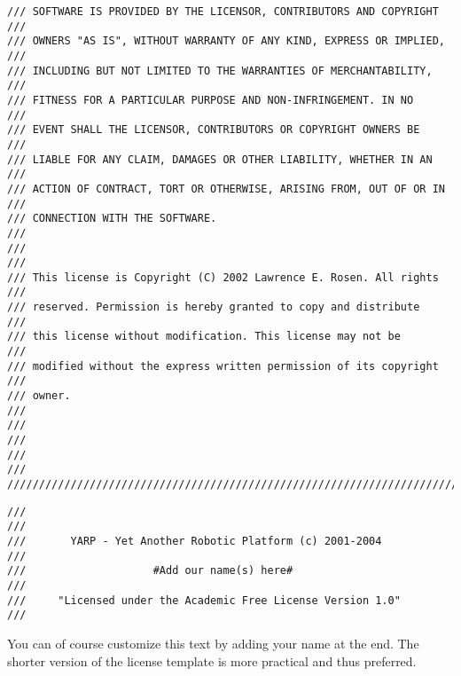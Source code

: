 \begin{verbatim}
/// SOFTWARE IS PROVIDED BY THE LICENSOR, CONTRIBUTORS AND COPYRIGHT  ///
/// OWNERS "AS IS", WITHOUT WARRANTY OF ANY KIND, EXPRESS OR IMPLIED, ///
/// INCLUDING BUT NOT LIMITED TO THE WARRANTIES OF MERCHANTABILITY,   ///
/// FITNESS FOR A PARTICULAR PURPOSE AND NON-INFRINGEMENT. IN NO      ///
/// EVENT SHALL THE LICENSOR, CONTRIBUTORS OR COPYRIGHT OWNERS BE     ///
/// LIABLE FOR ANY CLAIM, DAMAGES OR OTHER LIABILITY, WHETHER IN AN   ///
/// ACTION OF CONTRACT, TORT OR OTHERWISE, ARISING FROM, OUT OF OR IN ///
/// CONNECTION WITH THE SOFTWARE.                                     ///
///                                                                   ///
/// This license is Copyright (C) 2002 Lawrence E. Rosen. All rights  ///
/// reserved. Permission is hereby granted to copy and distribute     ///
/// this license without modification. This license may not be        ///
/// modified without the express written permission of its copyright  ///
/// owner.                                                            ///
///                                                                   ///
///                                                                   ///
/////////////////////////////////////////////////////////////////////////
\end{verbatim}

\begin{verbatim}
///
///
///       YARP - Yet Another Robotic Platform (c) 2001-2004 
///
///                    #Add our name(s) here#
///
///     "Licensed under the Academic Free License Version 1.0"
///
\end{verbatim}

You can of course customize this text by adding your name at the end. The shorter version of the license template is more practical and thus preferred.